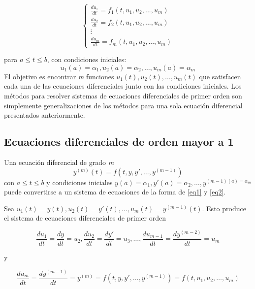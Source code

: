 \documentclass[titlepage,a4paper]{article}
\begin{document}
		\begin{equation}
			\label{eq1}
			\begin{cases}
				\frac{du_{1}}{dt}=f_{1}(t,u_{1},u_{2},...,u_{m})\\
				\frac{du_{2}}{dt}=f_{2}(t,u_{1},u_{2},...,u_{m})\\
				\vdots\\
				\frac{du_{m}}{dt}=f_{m}(t,u_{1},u_{2},...,u_{m})
			\end{cases}
		\end{equation}

		para $a \leq t \leq b$, con condiciones iniciales:
		\begin{equation}
			\label{eq2}
			u_{1}(a) = \alpha_{1}, u_{2}(a)=\alpha_{2}, \dots, u_{m}(a)=\alpha_{m}
		\end{equation}
		El objetivo es encontrar \emph{m} funciones $u_{1}(t),u_{2}(t),\dots,u_{m}(t)$ que satisfacen 
		cada una de las ecuaciones diferenciales junto con las condiciones iniciales.
		Los métodos para resolver sistemas de ecuaciones diferenciales de primer orden son simplemente 
		generalizaciones de los métodos para una sola ecuación diferencial presentados anteriormente.

	\subsection{Ecuaciones diferenciales de orden mayor a 1}\cite{burden_higher_order_diff_eq}
			Una ecuación diferencial de grado \emph{m}
			\begin{equation}
				y^{(m)}(t)=f(t,y,y',\dots,y^{(m-1)})
			\end{equation}
			con $a \leq t \leq b$ y condiciones iniciales $y(a)=\alpha_{1},y'(a)=\alpha_{2},\dots,y^{(m-1)(a)=\alpha_{m}}$ 
			puede convertirse a un sistema de ecuaciones de la forma de \eqref{eq1} y \eqref{eq2}.

			Sea $u_{1}(t)=y(t),u_{2}(t)=y'(t),\dots,u_{m}(t)=y^{(m-1)}(t)$. Esto produce el sistema de ecuaciones diferenciales 
			de primer orden

			\begin{equation}
				\frac{du_{1}}{dt}=\frac{dy}{dt}=u_{2},\frac{du_{2}}{dt}=\frac{dy'}{dt}=u_{3},\dots,\frac{du_{m-1}}{dt}=\frac{dy^{(m-2)}}{dt}=u_{m}
			\end{equation}

			y

			\begin{equation}
				\frac{du_{m}}{dt}=\frac{dy^{(m-1)}}{dt}=y^{(m)}=f(t,y,y',\dots,y^{(m-1)})=f(t,u_{1},u_{2},\dots,u_{m})
			\end{equation}
\end{document}
